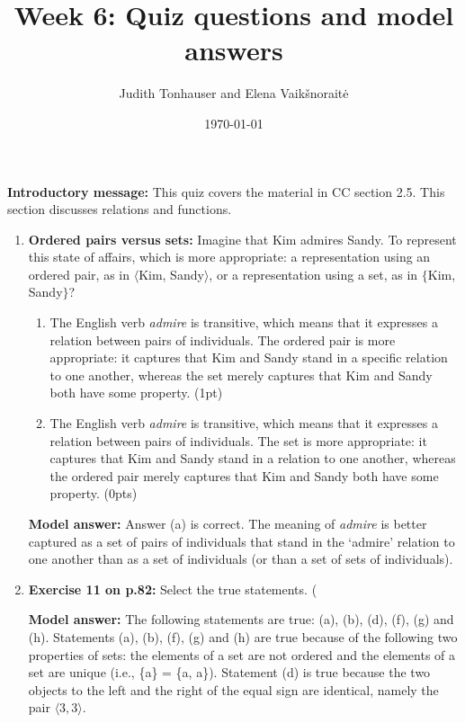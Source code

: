 \documentclass[a4,11pt]{article}
\title{Week 6: Quiz questions and model answers}
\author{Judith Tonhauser and Elena Vaik\v snorait\.{e} }
\date{\today}
\begin{document}
\maketitle

{\bf Introductory message:} This quiz covers the material in CC section 2.5. This section discusses relations and functions.

\begin{enumerate}[leftmargin = 12pt]

\item {\bf Ordered pairs versus sets:} Imagine that Kim admires Sandy. To represent this state of affairs, which is more appropriate: a representation using an ordered pair, as in $\langle$Kim, Sandy$\rangle$, or a representation using a set, as in $\{$Kim, Sandy$\}$?

 \begin{enumerate}[noitemsep]
        \item The English verb {\em admire} is transitive, which means that it expresses a relation between pairs of individuals. The ordered pair is more appropriate: it captures that Kim and Sandy stand in a specific relation to one another, whereas the set merely captures that Kim and Sandy both have some property. (1pt)
        
        \item The English verb {\em admire} is transitive, which means that it expresses a relation between pairs of individuals. The set is more appropriate: it captures that Kim and Sandy stand in a relation to one another, whereas the ordered pair merely captures that Kim and Sandy both have some property. (0pts)
\end{enumerate}

{\bf Model answer:} Answer (a) is correct. The meaning of {\em admire} is better captured as a set of pairs of individuals that stand in the `admire' relation to one another than as a set of individuals (or than a set of sets of individuals).

\item {\bf Exercise 11 on p.82:} Select the true statements. (

{\bf Model answer:}  The following statements are true: (a), (b), (d), (f), (g) and (h). Statements (a), (b), (f), (g) and (h) are true because of the following two properties of sets: the elements of a set are not ordered and the elements of a set are unique (i.e., \{a\} = \{a, a\}). Statement (d) is true because the two objects to the left and the right of the equal sign are identical, namely the pair $\langle 3,3 \rangle$. 


\end{enumerate}
\end{document}
